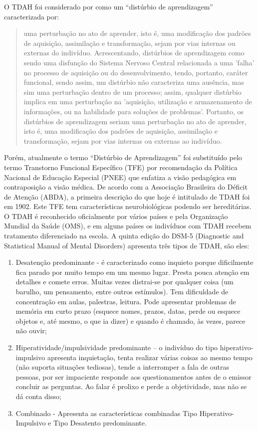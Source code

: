 \documentclass{textolivre}
\begin{document}
O TDAH foi considerado por \textcite[p. 231]{carvalho_disturbios_2007} como um “distúrbio de aprendizagem” caracterizada por: 

\begin{quote}
    uma perturbação no ato de aprender, isto é, uma modificação dos padrões de aquisição, assimilação e transformação, sejam por vias internas ou externas do indivíduo. Acrescentando, distúrbios de aprendizagem como sendo uma disfunção do Sistema Nervoso Central relacionada a uma 'falha' no processo de aquisição ou do desenvolvimento, tendo, portanto, caráter funcional, sendo assim, um distúrbio não caracteriza uma ausência, mas sim uma perturbação dentro de um processo; assim, qualquer distúrbio implica em uma perturbação na 'aquisição, utilização e armazenamento de informações, ou na habilidade para soluções de problemas'. Portanto, os distúrbios de aprendizagem seriam uma perturbação no ato de aprender, isto é, uma modificação dos padrões de aquisição, assimilação e transformação, sejam por vias internas ou externas ao indivíduo.
\end{quote}

Porém, atualmente o termo “Distúrbio de Aprendizagem” foi substituído pelo termo Transtorno Funcional Específico (TFE) por recomendação da Política Nacional de Educação Especial (PNEE) que enfatiza a visão pedagógica em contraposição a visão médica. De acordo com a Associação Brasileira do Déficit de Atenção (ABDA), a primeira descrição do que hoje é intitulado de TDAH foi em 1902. Este TFE tem características neurobiológicas podendo ser hereditárias. O TDAH é reconhecido oficialmente por vários países e pela Organização Mundial da Saúde (OMS), e em alguns países os indivíduos com TDAH recebem tratamento diferenciado na escola. A quinta edição do DSM-5 (Diagnostic and Statistical Manual of Mental Disorders) apresenta três tipos de TDAH, são eles: 

\begin{enumerate}
    \item Desatenção predominante - é caracterizado como inquieto porque dificilmente fica parado por muito tempo em um mesmo lugar. Presta pouca atenção em detalhes e comete erros. Muitas vezes distrai-se por qualquer coisa (um barulho, um pensamento, entre outros estímulos). Tem dificuldade de concentração em aulas, palestras, leitura. Pode apresentar problemas de memória em curto prazo (esquece nomes, prazos, datas, perde ou esquece objetos e, até mesmo, o que ia dizer) e quando é chamado, às vezes, parece não ouvir;
    \item Hiperatividade/impulsividade predominante – o indivíduo do tipo hiperativo-impulsivo apresenta inquietação, tenta realizar várias coisas ao mesmo tempo (não suporta situações tediosas), tende a interromper a fala de outras pessoas, por ser impaciente responde aos questionamentos antes de o emissor concluir as perguntas. Ao falar é prolixo e perde a objetividade, mas não se dá conta disso;
    \item Combinado - Apresenta as características combinadas Tipo Hiperativo-Impulsivo e Tipo Desatento predominante.
\end{enumerate}
\end{document}
